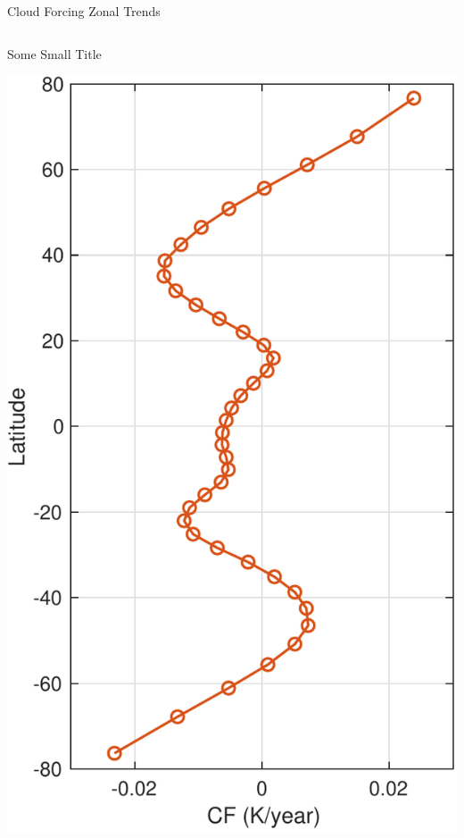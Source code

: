 \documentclass[10pt,t]{beamer}
\begin{document}
\begin{frame}[label={sec:orgd0b9c54}]{Cloud Forcing Zonal Trends}
\vspace{-0.3in}

\begin{columns}
\begin{column}{0.33\columnwidth}
\begin{block}{\footnotesize Some Small Title}
\vspace{0.0in}
\begin{center}
\includegraphics[width=\linewidth]{./Figs/Pdf/new_trend_rand_stats_1231_and_2161_era_clr_minus_obs_smoothed.pdf}
\end{center}
\end{block}
\end{column}


\end{columns}
\end{frame}
\end{document}
